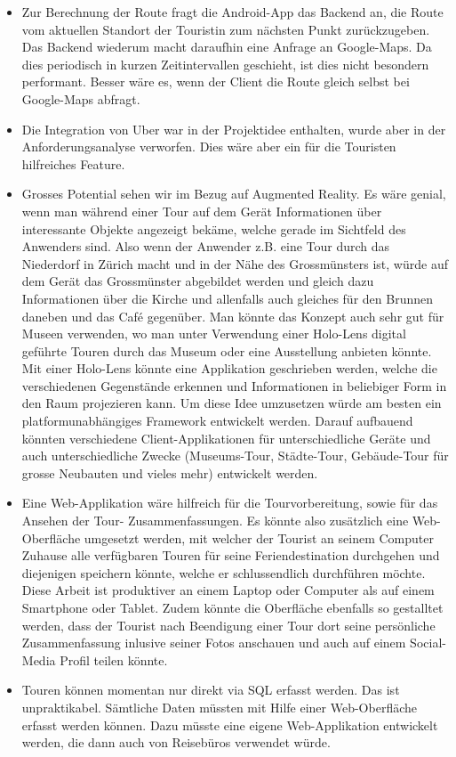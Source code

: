 \begin{itemize}
  \item Zur Berechnung der Route fragt die Android-App das Backend an, die Route vom aktuellen Standort der Touristin zum nächsten Punkt zurückzugeben. Das Backend wiederum macht daraufhin eine Anfrage an Google-Maps. Da dies periodisch in kurzen Zeitintervallen geschieht, ist dies nicht besondern performant. Besser wäre es, wenn der Client die Route gleich selbst bei Google-Maps abfragt.
  \item Die Integration von Uber war in der Projektidee enthalten, wurde aber in der Anforderungsanalyse verworfen. Dies wäre aber ein für die Touristen hilfreiches Feature.
  \item Grosses Potential sehen wir im Bezug auf Augmented Reality. Es wäre genial, wenn man während einer Tour auf dem Gerät Informationen über interessante Objekte angezeigt bekäme, welche gerade im Sichtfeld des Anwenders sind. Also wenn der Anwender z.B. eine Tour durch das Niederdorf in Zürich macht und in der Nähe des Grossmünsters ist, würde auf dem Gerät das Grossmünster abgebildet werden und gleich dazu Informationen über die Kirche und allenfalls auch gleiches für den Brunnen daneben und das Café gegenüber. Man könnte das Konzept auch sehr gut für Museen verwenden, wo man unter Verwendung einer Holo-Lens digital geführte Touren durch das Museum oder eine Ausstellung anbieten könnte. Mit einer Holo-Lens könnte eine Applikation geschrieben werden, welche die verschiedenen Gegenstände erkennen und Informationen in beliebiger Form in den Raum projezieren kann. Um diese Idee umzusetzen würde am besten ein platformunabhängiges Framework entwickelt werden. Darauf aufbauend könnten verschiedene Client-Applikationen für unterschiedliche Geräte und auch unterschiedliche Zwecke (Museums-Tour, Städte-Tour, Gebäude-Tour für grosse Neubauten und vieles mehr) entwickelt werden.
  \item Eine Web-Applikation wäre hilfreich für die Tourvorbereitung, sowie für das Ansehen der Tour- Zusammenfassungen. Es könnte also zusätzlich eine Web-Oberfläche umgesetzt werden, mit welcher der Tourist an seinem Computer Zuhause alle verfügbaren Touren für seine Feriendestination durchgehen und diejenigen speichern könnte, welche er schlussendlich durchführen möchte. Diese Arbeit ist produktiver an einem Laptop oder Computer als auf einem Smartphone oder Tablet. Zudem könnte die Oberfläche ebenfalls so gestalltet werden, dass der Tourist nach Beendigung einer Tour dort seine persönliche Zusammenfassung inlusive seiner Fotos anschauen und auch auf einem Social-Media Profil teilen könnte.
  \item Touren können momentan nur direkt via SQL erfasst werden. Das ist unpraktikabel. Sämtliche Daten müssten mit Hilfe einer Web-Oberfläche erfasst werden können. Dazu müsste eine eigene Web-Applikation entwickelt werden, die dann auch von Reisebüros verwendet würde.
\end{itemize}
